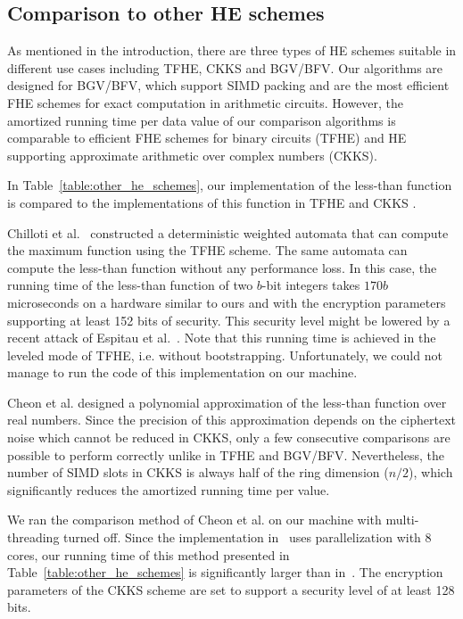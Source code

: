 \subsection{Comparison to other HE schemes}
    As mentioned in the introduction, there are three types of HE schemes suitable in different use cases including TFHE, CKKS and BGV/BFV.
    Our algorithms are designed for BGV/BFV, which support SIMD packing and are the most efficient FHE schemes for exact computation in arithmetic circuits.
    However, the amortized running time per data value of our comparison algorithms is comparable to efficient FHE schemes for binary circuits (TFHE) and HE supporting approximate arithmetic over complex numbers (CKKS). 

    In Table~\ref{table:other_he_schemes}, our implementation of the less-than function is compared to the implementations of this function in TFHE \cite{AC:CGGI17,JC:CGGI20} and CKKS \cite{EPRINT:CheKimKim19}.

    Chilloti et al.~\cite{AC:CGGI17,JC:CGGI20} constructed a deterministic weighted automata that can compute the maximum function using the TFHE scheme.
    The same automata can compute the less-than function without any performance loss. 
    In this case, the running time of the less-than function of two $b$-bit integers takes $170 b$ microseconds on a hardware similar to ours and with the encryption parameters supporting at least 152 bits of security.
    This security level might be lowered by a recent attack of Espitau et al.~\cite{EPRINT:EJK20}.
    Note that this running time is achieved in the leveled mode of TFHE, i.e. without bootstrapping.
    Unfortunately, we could not manage to run the code of this implementation on our machine.

    Cheon et al. \cite{EPRINT:CheKimKim19} designed a polynomial approximation of the less-than function over real numbers.
    Since the precision of this approximation depends on the ciphertext noise which cannot be reduced in CKKS, only a few consecutive comparisons are possible to perform correctly unlike in TFHE and BGV/BFV.
    Nevertheless, the number of SIMD slots in CKKS is always half of the ring dimension ($n/2$), which significantly reduces the amortized running time per value.

    We ran the comparison method of Cheon et al. on our machine with multi-threading turned off. 
    Since the implementation in~\cite{EPRINT:CheKimKim19} uses parallelization with 8 cores, our running time of this method presented in Table~\ref{table:other_he_schemes} is significantly larger than in~\cite{EPRINT:CheKimKim19}.
    The encryption parameters of the CKKS scheme are set to support a security level of at least 128 bits.

